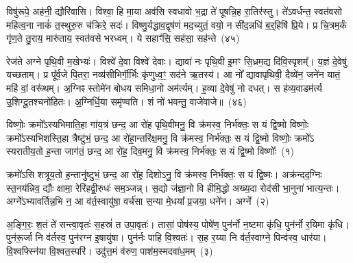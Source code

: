 विषु॑रूपे॒ अह॑नी॒ द्यौरि॑वासि। विश्वा॒ हि मा॒या अव॑सि स्वधावो भ॒द्रा ते॑ पूषन्नि॒ह रा॒तिर॑स्तु। ते॑\-ऽवर्धन्त॒ स्वत॑वसो महित्व॒ना नाकं॑ त॒स्थुरु॒रु च॑क्रिरे॒ सदः॑। विष्णु॒र्यद्धाव॒द्वृष॑णं मद॒च्युतं॒ वयो॒ न सी॑द॒न्नधि॑ ब॒र्॒\mbox{}हिषि॑ प्रि॒ये। प्र चि॒त्रम॒र्कं गृ॑ण॒ते तु॒राय॒ मारु॑ताय॒ स्वत॑वसे भरध्वम्। ये सहाꣳ॑सि॒ सह॑सा॒ सह॑न्ते~(४५)

रेज॑ते अग्ने पृथि॒वी म॒खेभ्यः॑। विश्वे॑ दे॒वा विश्वे॑ देवाः। द्यावा॑ नः पृथि॒वी इ॒मꣳ सि॒ध्रम॒द्य दि॑वि॒स्पृशम्᳚। य॒ज्ञं दे॒वेषु॑ यच्छताम्। प्र पू᳚र्व॒जे पि॒तरा॒ नव्य॑सीभिर्गी॒र्भिः कृ॑णुध्व॒ꣳ॒ सद॑ने ऋ॒तस्य॑। आ नो᳚ द्यावा\-पृथिवी॒ दैव्ये॑न॒ जने॑न यातं॒ महि॑ वां॒ वरू॑थम्। अ॒ग्निꣴ स्तोमे॑न बोधय समिधा॒नो अम॑र्त्यम्। ह॒व्या दे॒वेषु॑ नो दधत्। स ह॑व्य॒वाडम॑र्त्य उ॒शिग्दू॒तश्चनो॑हितः। अ॒ग्निर्धि॒या समृ॑ण्वति। शं नो॑ भवन्तु॒ वाजे॑वाजे॥~(४६)

{\anuvakamend[{पू॒रु॒ष॒त्वता॑ यज॒तन्ते॑ अ॒न्यथ्सह॑न्ते॒ चनो॑हितो॒\-ऽष्टौ च॑}]}%


{\anuvakamend[{विष्णोः॒ क्रमो॑\-ऽसि दि॒वस्पर्यन्न॑प॒ते\-ऽपे॑त॒ समि॑तं॒ या जा॒ता मा नो॑ हिꣳसीद्ध्रु॒वा\-ऽस्या॑दि॒त्यङ्गर्भ॒मिन्द्रा᳚ग्नी रोच॒नैका॑\-दश}]}%

{}

\setcounter{anuvakam}{0}
विष्णोः॒ क्रमो᳚\-ऽस्यभिमाति॒हा गा॑य॒त्रं छन्द॒ आ रो॑ह पृथि॒वीमनु॒ वि क्र॑मस्व॒ निर्भ॑क्तः॒ स यं द्वि॒ष्मो विष्णोः॒ क्रमो᳚\-ऽस्यभिशस्ति॒हा त्रैष्टु॑भं॒ छन्द॒ आ रो॑हा॒न्तरि॑क्ष॒मनु॒ वि क्र॑मस्व॒ निर्भ॑क्तः॒ स यं द्वि॒ष्मो विष्णोः॒ क्रमो᳚\-ऽ स्यरातीय॒तो ह॒न्ता जाग॑तं॒ छन्द॒ आ रो॑ह॒ दिव॒मनु॒ वि क्र॑मस्व॒ निर्भ॑क्तः॒ स यं द्वि॒ष्मो विष्णोः᳚~(१)

क्रमो॑\-ऽसि शत्रूय॒तो ह॒न्तानु॑ष्टुभं॒ छन्द॒ आ रो॑ह॒ दिशो\-ऽनु॒ वि क्र॑मस्व॒ निर्भ॑क्तः॒ स यं द्वि॒ष्मः। अक्र॑न्दद॒ग्निः स्त॒नय॑न्निव॒ द्यौः क्षामा॒ रेरि॑हद्वी॒रुधः॑ सम॒ञ्जन्न्। स॒द्यो ज॑ज्ञा॒नो वि हीमि॒द्धो अख्य॒दा रोद॑सी भा॒नुना॑ भात्य॒न्तः। अग्ने᳚\-ऽभ्यावर्तिन्न॒भि न॒ आ व॑र्त॒स्वायु॑षा॒ वर्च॑सा स॒न्या मे॒धया᳚ प्र॒जया॒ धने॑न। अग्ने᳚~(२)

अ॒ङ्गि॒रः॒ श॒तं ते॑ सन्त्वा॒वृतः॑ स॒हस्रं॑ त उपा॒वृतः॑। तासां॒ पोष॑स्य॒ पोषे॑ण॒ पुन॑र्नो न॒ष्टमा कृ॑धि॒ पुन॑र्नो र॒यिमा कृ॑धि। पुन॑रू॒र्जा नि व॑र्तस्व॒ पुन॑रग्न इ॒षायु॑षा। पुन॑र्नः पाहि वि॒श्वतः॑। स॒ह र॒य्या नि व॑र्त॒स्वाग्ने॒ पिन्व॑स्व॒ धार॑या। वि॒श्वफ्स्नि॑या वि॒श्वत॒स्परि॑। उदु॑त्त॒मं व॑रुण॒ पाश॑म॒स्मदवा॑ध॒मम्~(३)

